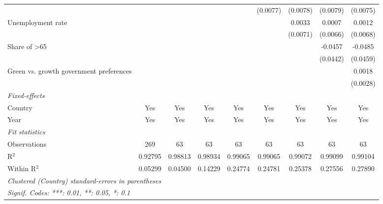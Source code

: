 \begin{table}[htbp]
\begin{tabular}{lcccccccc}
                                                                         &               &          &          &               & (0.0077)      & (0.0078)      & (0.0079)      & (0.0075)\\   
      Unemployment rate                                                  &               &          &          &               &               & 0.0033        & 0.0007        & 0.0012\\   
                                                                         &               &          &          &               &               & (0.0071)      & (0.0066)      & (0.0068)\\   
      Share of >65                                                       &               &          &          &               &               &               & -0.0457       & -0.0485\\   
                                                                         &               &          &          &               &               &               & (0.0442)      & (0.0459)\\   
      Green vs. growth government preferences                            &               &          &          &               &               &               &               & 0.0018\\   
                                                                         &               &          &          &               &               &               &               & (0.0028)\\   
      \midrule
      \emph{Fixed-effects}\\
      Country                                                            & Yes           & Yes      & Yes      & Yes           & Yes           & Yes           & Yes           & Yes\\  
      Year                                                               & Yes           & Yes      & Yes      & Yes           & Yes           & Yes           & Yes           & Yes\\  
      \midrule
      \emph{Fit statistics}\\
      Observations                                                       & 269           & 63       & 63       & 63            & 63            & 63            & 63            & 63\\  
      R$^2$                                                              & 0.92795       & 0.98813  & 0.98934  & 0.99065       & 0.99065       & 0.99072       & 0.99099       & 0.99104\\  
      Within R$^2$                                                       & 0.05299       & 0.04500  & 0.14229  & 0.24774       & 0.24781       & 0.25378       & 0.27556       & 0.27890\\  
      \midrule \midrule
      \multicolumn{9}{l}{\emph{Clustered (Country) standard-errors in parentheses}}\\
      \multicolumn{9}{l}{\emph{Signif. Codes: ***: 0.01, **: 0.05, *: 0.1}}\\
   \end{tabular}
\end{table}


